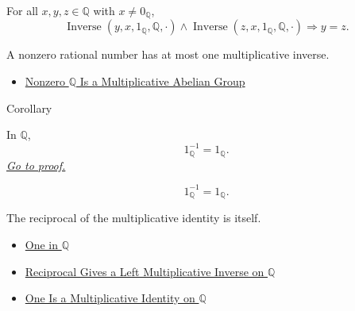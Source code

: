 \begin{remark*}
For all $x,y,z\in\mathbb{Q}$ with $x\ne 0_{\mathbb{Q}}$,
\[
\operatorname{Inverse}(y,x,1_{\mathbb{Q}},\mathbb{Q},\cdot)
\land
\operatorname{Inverse}(z,x,1_{\mathbb{Q}},\mathbb{Q},\cdot)
\Longrightarrow y=z.
\]
\end{remark*}

\begin{remark*}[Interpretation]
A nonzero rational number has at most one multiplicative inverse.
\end{remark*}

\begin{dependencies}
\begin{itemize}
  \item \hyperref[thm:q-nonzero-multiplicative-abelian-group]{Nonzero $\mathbb{Q}$ Is a Multiplicative Abelian Group}
\end{itemize}
\end{dependencies}

\begin{corollarybox}{Corollary}
\begin{corollary}
\label{cor:inverse-of-one-is-one-on-q}
In $\mathbb{Q}$,
\[
1_{\mathbb{Q}}^{-1}=1_{\mathbb{Q}}.
\]
\hyperref[prf:inverse-of-one-is-one-on-q]{\textit{Go to proof.}}
\end{corollary}
\end{corollarybox}

\begin{remark*}
\[
1_{\mathbb{Q}}^{-1}=1_{\mathbb{Q}}.
\]
\end{remark*}

\begin{remark*}[Interpretation]
The reciprocal of the multiplicative identity is itself.
\end{remark*}

\begin{dependencies}
\begin{itemize}
  \item \hyperref[def:one-in-q]{One in $\mathbb{Q}$}
  \item \hyperref[thm:reciprocal-left-multiplicative-inverse-on-q]{Reciprocal Gives a Left Multiplicative Inverse on $\mathbb{Q}$}
  \item \hyperref[thm:one-multiplicative-identity-on-q]{One Is a Multiplicative Identity on $\mathbb{Q}$}
\end{itemize}
\end{dependencies}

